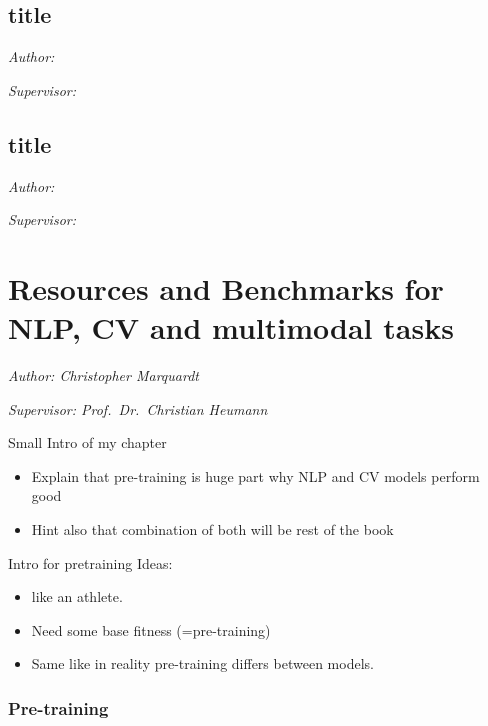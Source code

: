 \documentclass[
]{krantz}
\begin{document}
\hypertarget{title}{%
\section{title}\label{title}}

\emph{Author: }

\emph{Supervisor: }

\hypertarget{title-1}{%
\section{title}\label{title-1}}

\emph{Author: }

\emph{Supervisor: }

\hypertarget{resources-and-benchmarks-for-nlp-cv-and-multimodal-tasks}{%
\chapter{Resources and Benchmarks for NLP, CV and multimodal tasks}\label{resources-and-benchmarks-for-nlp-cv-and-multimodal-tasks}}

\emph{Author: Christopher Marquardt}

\emph{Supervisor: Prof.~Dr.~Christian Heumann}

Small Intro of my chapter

\begin{itemize}
  \item Explain that pre-training is huge part why NLP and CV models perform good
  \item Hint also that combination of both will be rest of the book
\end{itemize}

Intro for pretraining Ideas:

\begin{itemize}
  \item like an athlete. 
  \item Need some base fitness (=pre-training)
  \item Same like in reality pre-training differs between models. 
\end{itemize}

\subsection{Pre-training}
\end{document}
